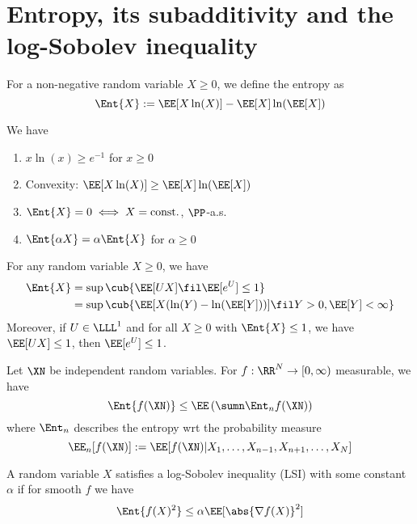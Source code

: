 \section{Entropy, its subadditivity and the log-Sobolev inequality}


\begin{defn}[Entropy]
    For a non-negative random variable $X\geq 0$, we define the entropy as 
    $$\Ent{X}:= \EE[X\ln(X)]- \EE[X]\ln(\EE[X])$$
\end{defn}


\begin{remark}  
    We have 
    \begin{enumerate}
        \item $x\ln(x) \geq e^{-1}$ for $x\geq 0$
        \item Convexity: $\EE[X \ln(X)] \geq \EE[X] \ln(\EE[X])$
        \item $\Ent{X}=0 \iff X = \operatorname{const.}$, $\PP$-a.s.
        \item $\Ent{\alpha X}= \alpha \Ent{X}$ for $\alpha \geq 0$
    \end{enumerate}
\end{remark}


\begin{thm}
    For any random variable $X\geq 0$, we have 
    \begin{align*}
        \Ent{X} &= \sup \cub{\EE[UX] \fil \EE[e^U]\leq 1} \\
        &= \sup \cub{ \EE[X(\ln(Y) - \ln(\EE[Y]))] \fil Y>0, \EE[Y]<\infty}
    \end{align*}
    Moreover, if $U\in \LLL^1$ and for all $X\geq 0$ with $\Ent{X}\leq 1$, we have $\EE[UX]\leq 1$, then $\EE[e^{U}]\leq 1$.
\end{thm}


\begin{thm}
    Let $\XN$ be independent random variables. For $f:\RR^{N}\to [0,\infty)$ measurable, we have 
    $$\Ent{f(\XN)} \leq \EE\left( \sumn \Ent_n f(\XN) \right)$$
    where $\Ent_n$ describes the entropy wrt the probability measure 
    $$\EE_n [f(\XN)] := \EE[f(\XN) \vert X_1,\dots, X_{n-1},X_{n+1}, \dots, X_N]$$
\end{thm}


\begin{defn}
    A random variable $X$ satisfies a log-Sobolev inequality (LSI) with some constant $\alpha$ if for smooth $f$ we have 
    $$\Ent{f(X)^2} \leq \alpha \EE[\abs{\nabla f(X)}^2]$$
\end{defn}



